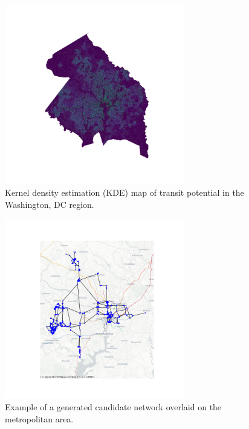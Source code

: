 \documentclass[manuscript,nonacm]{acmart}
\begin{document}
\begin{figure}[h]
    \centering
    \includegraphics[width=0.7\textwidth]{img/transit_potential.png}
    \caption{Kernel density estimation (KDE) map of transit potential in the Washington, DC region.}
    \label{fig:kde}
\end{figure}


\begin{figure}[h]
    \centering
    \includegraphics[width=0.7\textwidth]{img/network_map.png}
    \caption{Example of a generated candidate network overlaid on the metropolitan area.}
    \label{fig:networkmap}
\end{figure}

\end{document}
